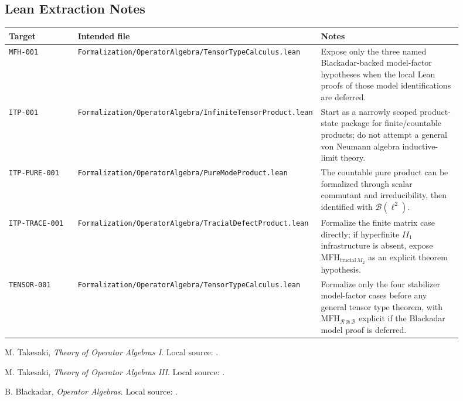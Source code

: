 \documentclass{article}
\newcommand{\cB}{\mathcal B}
\newcommand{\cR}{\mathcal R}
\begin{document}
\subsection*{Lean Extraction Notes}

\begin{longtable}{@{}p{0.18\linewidth}p{0.34\linewidth}p{0.38\linewidth}@{}}
\toprule
Target & Intended file & Notes \\
\midrule
\endhead
\texttt{MFH-001} &
\texttt{Formalization/OperatorAlgebra/TensorTypeCalculus.lean} &
Expose only the three named Blackadar-backed model-factor hypotheses when the
local Lean proofs of those model identifications are deferred. \\
\texttt{ITP-001} &
\texttt{Formalization/OperatorAlgebra/InfiniteTensorProduct.lean} &
Start as a narrowly scoped product-state package for finite/countable products;
do not attempt a general von Neumann algebra inductive-limit theory. \\
\texttt{ITP-PURE-001} &
\texttt{Formalization/OperatorAlgebra/PureModeProduct.lean} &
The countable pure product can be formalized through scalar commutant and
irreducibility, then identified with \(\cB(\ell^2)\). \\
\texttt{ITP-TRACE-001} &
\texttt{Formalization/OperatorAlgebra/TracialDefectProduct.lean} &
Formalize the finite matrix case directly; if hyperfinite \(II_1\)
infrastructure is absent, expose \(\mathrm{MFH}_{\mathrm{tracial}\,M_2}\) as
an explicit theorem hypothesis. \\
\texttt{TENSOR-001} &
\texttt{Formalization/OperatorAlgebra/TensorTypeCalculus.lean} &
Formalize only the four stabilizer model-factor cases before any general tensor
type theorem, with \(\mathrm{MFH}_{\cR\otimes\cB}\) explicit if the
Blackadar model proof is deferred. \\
\bottomrule
\end{longtable}

\begin{thebibliography}{9}
M. Takesaki, \emph{Theory of Operator Algebras I}.  Local source:
.

M. Takesaki, \emph{Theory of Operator Algebras III}.  Local source:
.

B. Blackadar, \emph{Operator Algebras}.  Local source:
.
\end{thebibliography}
\end{document}
